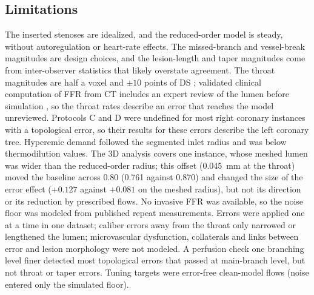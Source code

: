 \documentclass[journal,twoside,web]{ieeecolor}
\begin{document}
\subsection{Limitations}
The inserted stenoses are idealized, and the reduced-order model is steady, without autoregulation or heart-rate
effects. The missed-branch and vessel-break magnitudes are design choices, and the lesion-length and taper magnitudes come from
inter-observer statistics that likely overstate agreement. The throat magnitudes are half a voxel and $\pm 10$
points of DS \cite{boogers2010,gouya2009}; validated clinical computation of FFR from CT includes an expert review of the lumen before
simulation \cite{norgaard2014}, so the throat rates describe an error that reaches the model unreviewed. Protocols C and D were undefined for most right coronary
instances with a topological error, so their results for these errors describe the left coronary tree. Hyperemic
demand followed the segmented inlet radius and was below thermodilution values. The 3D analysis covers one instance, whose
meshed lumen was wider than the reduced-order radius; this offset (0.045~mm at the throat) moved the baseline
across 0.80 (0.761 against 0.870) and changed the size of the error effect ($+0.127$ against $+0.081$ on the meshed radius), but not its
direction or its reduction by prescribed flows. No invasive FFR was available, so the noise floor was modeled from published repeat
measurements. Errors were applied one at a time in one dataset; caliber errors away from the throat only narrowed or lengthened the lumen; microvascular
dysfunction, collaterals and links between error and lesion morphology were not modeled. A perfusion check one
branching level finer detected most topological errors that passed at main-branch level, but not throat or taper
errors. Tuning targets were error-free clean-model flows
(noise entered only the simulated floor).
\end{document}
